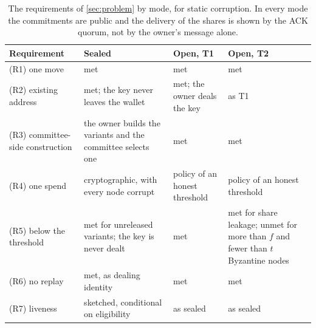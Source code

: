 \begin{table}[t]
\centering
\small
\begin{tabularx}{\linewidth}{@{}>{\raggedright\arraybackslash}p{3.1cm}>{\raggedright\arraybackslash}X>{\raggedright\arraybackslash}X>{\raggedright\arraybackslash}X@{}}
\toprule
Requirement & Sealed & Open, T1 & Open, T2 \\
\midrule
(R1) one move & met & met & met \\
(R2) existing address & met; the key never leaves the wallet & met; the owner deals the key & as T1 \\
(R3) committee-side construction & the owner builds the variants and the committee selects one & met & met \\
(R4) one spend & cryptographic, with every node corrupt & policy of an honest threshold & policy of an honest threshold \\
(R5) below the threshold & met for unreleased variants; the key is never dealt & met & met for share leakage; unmet for more than $f$ and fewer than $t$ Byzantine nodes \\
(R6) no replay & met, as dealing identity & met & met \\
(R7) liveness & sketched, conditional on eligibility & as sealed & as sealed \\
\bottomrule
\end{tabularx}
\caption{The requirements of \cref{sec:problem} by mode, for static corruption. In every mode the commitments are public and the delivery of the shares is shown by the ACK quorum, not by the owner's message alone.}
\label{tab:req}
\end{table}
